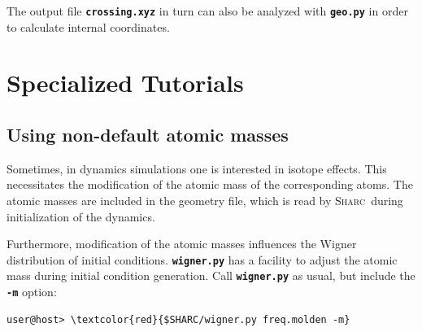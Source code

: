 \documentclass[a4paper,11pt,DIV=15,openany]{scrbook}
\newcommand{\sharc}{\textsc{Sharc}}
\newcommand{\ttt}[1]{\textbf{\texttt{#1}}}
\begin{document}
\normalsize
The output file \ttt{crossing.xyz} in turn can also be analyzed with \ttt{geo.py} in order to calculate internal coordinates. 







\chapter{Specialized Tutorials}

\section{Using non-default atomic masses}

Sometimes, in dynamics simulations one is interested in isotope effects. This necessitates the modification of the atomic mass of the corresponding atoms. The atomic masses are included in the geometry file, which is read by \sharc\ during initialization of the dynamics.

Furthermore, modification of the atomic masses influences the Wigner distribution of initial conditions. \ttt{wigner.py} has a facility to adjust the atomic mass during initial condition generation. Call \ttt{wigner.py} as usual, but include the \ttt{-m} option:
\begin{Verbatim}[commandchars=\\\{\}]
user@host> \textcolor{red}{$SHARC/wigner.py freq.molden -m}
\end{Verbatim}
\end{document}
